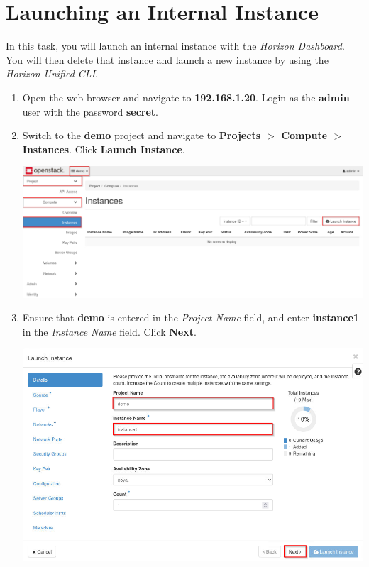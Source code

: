 \documentclass[letterpaper, 12pt]{article}
\begin{document}
\section{Launching an Internal Instance}
\label{sec:launching_an_internal_instance}
In this task, you will launch an internal instance with the \textit{Horizon Dashboard}. You will then delete that
instance and launch a new instance by using the \textit{Horizon Unified CLI}.

\begin{enumerate}
    \item Open the web browser and navigate to \textbf{192.168.1.20}. Login as the \textbf{admin} user with the password
    \textbf{secret}.

    \item Switch to the \textbf{demo} project and navigate to
    \textbf{Projects $>$ Compute $>$ Instances}. Click \textbf{Launch Instance}.

    \begin{center}
        \includegraphics[width=\linewidth]{images/part4/step2.png}
    \end{center}

    \item Ensure that \textbf{demo} is entered in the \textit{Project Name} field, and enter \textbf{instance1} in the
    \textit{Instance Name} field. Click \textbf{Next}.
    
    \begin{center}
        \includegraphics[width=\linewidth]{images/part4/step3.png}
    \end{center}


\end{enumerate}
\end{document}
